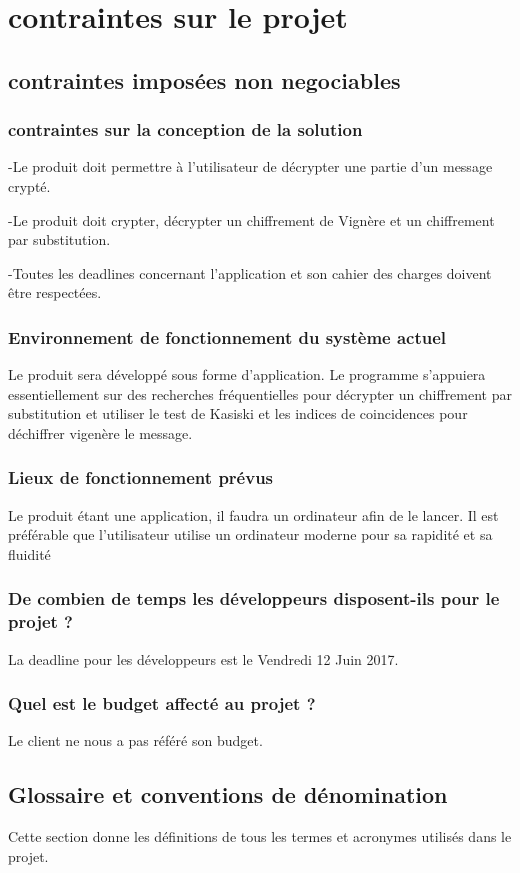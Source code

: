 \documentclass[a4]{article}
\begin{document}
	\section{contraintes sur le projet}
		\subsection{contraintes imposées non negociables} 
			\subsubsection{contraintes sur la conception de la solution}
				-Le produit doit permettre à l'utilisateur de décrypter une partie d'un message crypté.

				-Le produit doit crypter, décrypter un chiffrement de Vignère et un chiffrement par substitution.

				-Toutes les deadlines concernant l'application et son cahier des charges doivent être respectées.
			\subsubsection{Environnement de fonctionnement du système actuel }
				Le produit sera développé sous forme d'application. 
				Le programme s'appuiera essentiellement sur des recherches fréquentielles pour décrypter un chiffrement par substitution et utiliser le test de Kasiski et les indices de coincidences pour déchiffrer vigenère le message.
			\subsubsection{Lieux de fonctionnement prévus}
				Le produit étant une application, il faudra un ordinateur afin de le lancer.
				Il est préférable que l'utilisateur utilise un ordinateur moderne pour sa rapidité et sa fluidité
			\subsubsection{ De combien de temps les développeurs disposent-ils pour le projet ?}
				La deadline pour les développeurs est le Vendredi 12 Juin 2017.
			\subsubsection{ Quel est le budget affecté au projet ?}
				Le client ne nous a pas référé son budget.
		\subsection{Glossaire et conventions de dénomination}
			Cette section donne les définitions de tous les termes et acronymes utilisés dans le projet.
\end{document}
